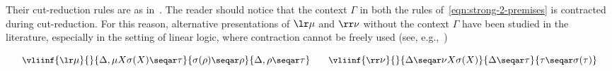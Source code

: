  
 Their cut-reduction rules are as in~. The reader should notice that the context $\Gamma$ in both the rules of~\eqref{eqn:strong-2-premises} is contracted during cut-reduction. For this reason, alternative presentations of $\lr\mu $ and $\rr \nu$ without  the context $\Gamma$ have been studied in the literature, especially in the setting of linear logic, where contraction cannot be freely used (see, e.g.,~\cite{BaeldeMiller07})
 
  \begin{equation}\label{eqn:weak-2-premises}
      \small
    \vliinf{\lr \mu}{}{\Delta, \mu X \sigma(X)  \seqar \tau}{ \sigma(\rho)\seqar \rho}{\Delta, \rho \seqar \tau}
  \qquad
   \vliinf{\rr \nu }{}{ \Delta  \seqar \nu X\sigma(X)}{\Delta \seqar  \tau }{   \tau \seqar \sigma(\tau)}
 \end{equation}


